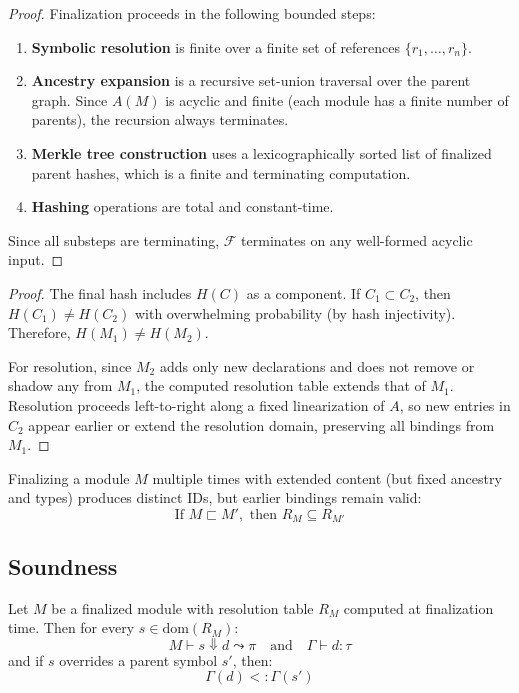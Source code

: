 \documentclass[sigplan,screen]{acmart}
\begin{document}
\begin{proof}
Finalization proceeds in the following bounded steps:
\begin{enumerate}
    \item \textbf{Symbolic resolution} is finite over a finite set of references $\{r_1, \dots, r_n\}$.
    \item \textbf{Ancestry expansion} is a recursive set-union traversal over the parent graph. Since $A(M)$ is acyclic and finite (each module has a finite number of parents), the recursion always terminates.
    \item \textbf{Merkle tree construction} uses a lexicographically sorted list of finalized parent hashes, which is a finite and terminating computation.
    \item \textbf{Hashing} operations are total and constant-time.
\end{enumerate}
Since all substeps are terminating, $\mathcal{F}$ terminates on any well-formed acyclic input.
\end{proof}

\begin{proof}
The final hash includes $H(C)$ as a component. If $C_1 \subset C_2$, then $H(C_1) \neq H(C_2)$ with overwhelming probability (by hash injectivity). Therefore, $H(M_1) \neq H(M_2)$.

For resolution, since $M_2$ adds only new declarations and does not remove or shadow any from $M_1$, the computed resolution table extends that of $M_1$. Resolution proceeds left-to-right along a fixed linearization of $A$, so new entries in $C_2$ appear earlier or extend the resolution domain, preserving all bindings from $M_1$.
\end{proof}

\begin{corollary}
\label{cor:stability-extension}
Finalizing a module $M$ multiple times with extended content (but fixed ancestry and types) produces distinct IDs, but earlier bindings remain valid:
\[
\text{If } M \sqsubset M', \text{ then } R_M \subseteq R_{M'}
\]
\end{corollary}

\subsection{Soundness}
\label{appendix:soundness}

\begin{theorem}
\label{thm:soundness}
Let $M$ be a finalized module with resolution table $R_M$ computed at finalization time. Then for every $s \in \text{dom}(R_M)$:
\[
M \vdash s \Downarrow d \leadsto \pi \quad\text{and}\quad \Gamma \vdash d : \tau
\]
and if $s$ overrides a parent symbol $s'$, then:
\[
\Gamma(d) <: \Gamma(s')
\]
\end{theorem}
\end{document}
